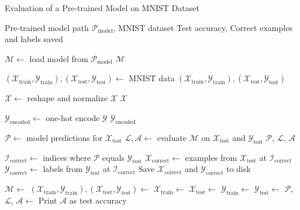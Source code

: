 \documentclass[11pt,onside]{article}
\begin{document}
\begin{algorithm}[H]
\caption{Evaluation of a Pre-trained Model on MNIST Dataset}
\begin{algorithmic}[1]
\Require Pre-trained model path $\mathcal{P}_{\text{model}}$, MNIST dataset
\Ensure Test accuracy, Correct examples and labels saved

    \State $\mathcal{M} \gets$ load model from $\mathcal{P}_{\text{model}}$
    \State \Return $\mathcal{M}$
\EndFunction

    \State $(\mathcal{X}_{\text{train}}, \mathcal{Y}_{\text{train}}), (\mathcal{X}_{\text{test}}, \mathcal{Y}_{\text{test}}) \gets$ MNIST data
    \State \Return $(\mathcal{X}_{\text{train}}, \mathcal{Y}_{\text{train}}), (\mathcal{X}_{\text{test}}, \mathcal{Y}_{\text{test}})$
\EndFunction

    \State $\mathcal{X} \gets$ reshape and normalize $\mathcal{X}$
    \State \Return $\mathcal{X}$
\EndFunction

    \State $\mathcal{Y}_{\text{encoded}} \gets$ one-hot encode $\mathcal{Y}$
    \State \Return $\mathcal{Y}_{\text{encoded}}$
\EndFunction

    \State $\mathcal{P} \gets$ model predictions for $\mathcal{X}_{\text{test}}$
    \State $\mathcal{L}, \mathcal{A} \gets$ evaluate $\mathcal{M}$ on $\mathcal{X}_{\text{test}}$ and $\mathcal{Y}_{\text{test}}$
    \State \Return $\mathcal{P}$, $\mathcal{L}$, $\mathcal{A}$
\EndFunction

    \State $\mathcal{I}_{\text{correct}} \gets$ indices where $\mathcal{P}$ equals $\mathcal{Y}_{\text{test}}$
    \State $\mathcal{X}_{\text{correct}} \gets$ examples from $\mathcal{X}_{\text{test}}$ at $\mathcal{I}_{\text{correct}}$
    \State $\mathcal{Y}_{\text{correct}} \gets$ labels from $\mathcal{Y}_{\text{test}}$ at $\mathcal{I}_{\text{correct}}$
    \State Save $\mathcal{X}_{\text{correct}}$ and $\mathcal{Y}_{\text{correct}}$ to disk
\EndFunction

\State $\mathcal{M} \gets$ 
\State $(\mathcal{X}_{\text{train}}, \mathcal{Y}_{\text{train}}), (\mathcal{X}_{\text{test}}, \mathcal{Y}_{\text{test}}) \gets$ 
\State $\mathcal{X}_{\text{train}} \gets$ 
\State $\mathcal{X}_{\text{test}} \gets$ 
\State $\mathcal{Y}_{\text{train}} \gets$ 
\State $\mathcal{Y}_{\text{test}} \gets$ 
\State $\mathcal{P}$, $\mathcal{L}$, $\mathcal{A} \gets$ 
\State Print $\mathcal{A}$ as test accuracy
\State {}


\end{algorithmic}
\end{algorithm}
\end{document}

